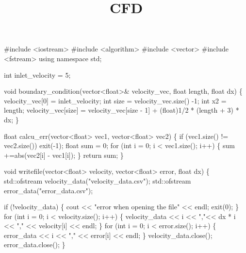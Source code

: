 \documentclass[
]{article}
\title{CFD}
\author{}
\date{}
\newenvironment{Shaded}{}{}
\newcommand{\NormalTok}[1]{#1}
\begin{document}
\maketitle

\begin{Shaded}
\begin{Highlighting}[]
\NormalTok{\#include \textless{}iostream\textgreater{}}
\NormalTok{\#include \textless{}algorithm\textgreater{}}
\NormalTok{\#include \textless{}vector\textgreater{}}
\NormalTok{\#include \textless{}fstream\textgreater{}}
\NormalTok{using namespace std;}

\NormalTok{int inlet\_velocity = 5;}

\NormalTok{void boundary\_condition(vector\textless{}float\textgreater{}\& velocity\_vec, float length, float dx) \{}
\NormalTok{    velocity\_vec[0] = inlet\_velocity;}
\NormalTok{    int size = velocity\_vec.size() {-}1;}
\NormalTok{    int x2 = length;}
\NormalTok{    velocity\_vec[size] = velocity\_vec[size {-} 1] + (float)1/2 * (length + 3) * dx;}
\NormalTok{\}}

\NormalTok{float calcu\_err(vector\textless{}float\textgreater{} vec1, vector\textless{}float\textgreater{} vec2) \{}
\NormalTok{    if (vec1.size() != vec2.size()) exit({-}1);}
\NormalTok{    float sum = 0;}
\NormalTok{    for (int i = 0; i \textless{} vec1.size(); i++) \{}
\NormalTok{        sum +=abs(vec2[i] {-} vec1[i]);}
\NormalTok{    \}}
\NormalTok{    return sum;}
\NormalTok{\}}

\NormalTok{void writefile(vector\textless{}float\textgreater{} velocity, vector\textless{}float\textgreater{} error, float dx) \{}
\NormalTok{    std::ofstream velocity\_data("velocity\_data.csv");}
\NormalTok{    std::ofstream error\_data("error\_data.csv");}
    
\NormalTok{    if (!velocity\_data) \{}
\NormalTok{        cout \textless{}\textless{} "error when opening the file" \textless{}\textless{} endl;}
\NormalTok{        exit(0);}
\NormalTok{    \}}
\NormalTok{    for (int i = 0; i \textless{} velocity.size(); i++) \{}
\NormalTok{        velocity\_data  \textless{}\textless{} i \textless{}\textless{} ","\textless{}\textless{} dx * i \textless{}\textless{} "," \textless{}\textless{} velocity[i] \textless{}\textless{} endl;}
\NormalTok{    \}}
\NormalTok{    for (int i = 0; i \textless{} error.size(); i++) \{}
\NormalTok{        error\_data \textless{}\textless{} i \textless{}\textless{} "," \textless{}\textless{} error[i] \textless{}\textless{} endl;}
\NormalTok{    \}}
\NormalTok{    velocity\_data.close();}
\NormalTok{    error\_data.close();}
\NormalTok{\}}


\end{Highlighting}
\end{Shaded}
\end{document}
